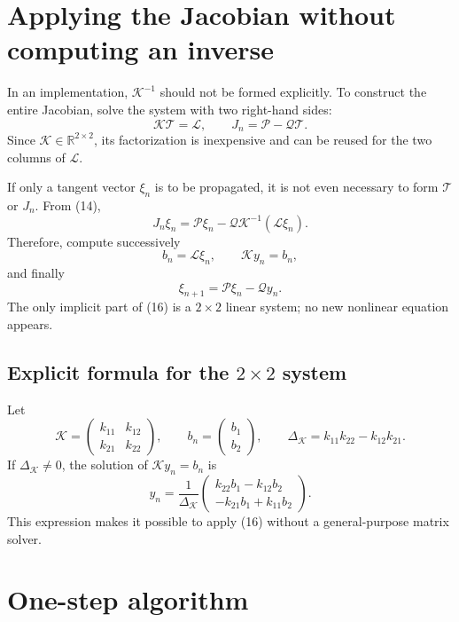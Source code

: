 \documentclass[11pt,a4paper]{article}
\newcommand{\R}{\mathbb{R}}
\begin{document}
\section{Applying the Jacobian without computing an inverse}

In an implementation, $\mathcal K^{-1}$ should not be formed explicitly. To construct the
entire Jacobian, solve the system with two right-hand sides:
\[
 \boxed{
 \mathcal K\mathcal T=\mathcal L,
 \qquad
 J_n=\mathcal P-\mathcal Q\mathcal T.
 }
 \tag{15}
\]
Since $\mathcal K\in\R^{2\times2}$, its factorization is inexpensive and can be reused for
the two columns of $\mathcal L$.

If only a tangent vector $\xi_n$ is to be propagated, it is not even necessary to form
$\mathcal T$ or $J_n$. From (14),
\[
 J_n\xi_n
 =\mathcal P\xi_n-\mathcal Q\mathcal K^{-1}(\mathcal L\xi_n).
\]
Therefore, compute successively
\[
 b_n=\mathcal L\xi_n,
 \qquad
 \mathcal K y_n=b_n,
\]
and finally
\[
 \boxed{
 \xi_{n+1}=\mathcal P\xi_n-\mathcal Qy_n.
 }
 \tag{16}
\]
The only implicit part of (16) is a $2\times2$ linear system; no new nonlinear equation
appears.

\subsection{Explicit formula for the \texorpdfstring{$2\times2$}{2 x 2} system}

Let
\[
 \mathcal K=
 \begin{pmatrix}
  k_{11}&k_{12}\\k_{21}&k_{22}
 \end{pmatrix},
 \qquad
 b_n=
 \begin{pmatrix}b_1\\b_2\end{pmatrix},
 \qquad
 \Delta_{\mathcal K}=k_{11}k_{22}-k_{12}k_{21}.
\]
If $\Delta_{\mathcal K}\neq0$, the solution of $\mathcal K y_n=b_n$ is
\[
 \boxed{
 y_n=
 \frac{1}{\Delta_{\mathcal K}}
 \begin{pmatrix}
  k_{22}b_1-k_{12}b_2\\
  -k_{21}b_1+k_{11}b_2
 \end{pmatrix}.
 }
 \tag{17}
\]
This expression makes it possible to apply (16) without a general-purpose matrix solver.

\section{One-step algorithm}
\end{document}
